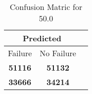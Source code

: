 \begin{table}[] 
\caption{Confusion Matric for 50.0} 
\label{Table: Prediction Accuracy-DMD50.0OnlySunEKF-ignoreReflection-Reflection} 
\centering 
\begin{tabular} 
 {@{}ccc@{}} 
\toprule 
\multicolumn{2}{c}{\textbf{Predicted}}
 \\ \midrule 
\multicolumn{1}{|c|}{Failure} & 
\multicolumn{1}{c|}{No Failure}
 \\ \midrule 
\multicolumn{1}{|c|}{\color{green}\textbf{51116}} & 
\multicolumn{1}{c|}{\color{green}\textbf{51132}}
 \\ \midrule 
\multicolumn{1}{|c|}{\color{red}\textbf{33666}} & 
\multicolumn{1}{c|}{\color{red}\textbf{34214}}
 \\ \bottomrule 
\end{tabular} 
\end{table} 
